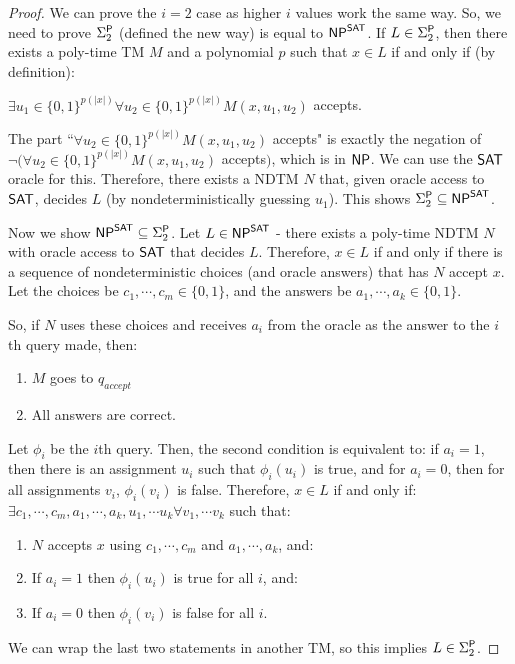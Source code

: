 \begin{proof}
We can prove the $i=2$ case as higher $i$ values work the same way. So, we need to prove $\Sigma_2^\P$ (defined the new way) is equal to $\NP^{\SAT}$. If $L \in \Sigma_2^\P$, then there exists a poly-time TM $M$ and a polynomial $p$ such that $x \in L$ if and only if (by definition):
\begin{center}
$\exists u_1 \in \{0, 1\}^{p(|x|)} \forall u_2 \in \{0, 1\}^{p(|x|)} M(x, u_1, u_2)$ accepts.
\end{center}
The part ``$\forall u_2 \in \{0, 1\}^{p(|x|)} M(x, u_1, u_2)$ accepts" is exactly the negation of $\neg (\forall u_2 \in \{0, 1\}^{p(|x|)} M(x, u_1, u_2)$ accepts$)$, which is in $\NP$. We can use the $\SAT$ oracle for this. Therefore, there exists a NDTM $N$ that, given oracle access to $\SAT$, decides $L$ (by nondeterministically guessing $u_1$). This shows $\Sigma_2^\P \subseteq \NP^{\SAT}$.

\par Now we show $\NP^{\SAT} \subseteq \Sigma_2^\P$. Let $L \in \NP^{\SAT}$ - there exists a poly-time NDTM $N$ with oracle access to $\SAT$ that decides $L$. Therefore, $x \in L$ if and only if there is a sequence of nondeterministic choices (and oracle answers) that has $N$ accept $x$. Let the choices be $c_1, \cdots, c_m \in \{0, 1\}$, and the answers be $a_1, \cdots, a_k \in \{0, 1\}$.

\par So, if $N$ uses these choices and receives $a_i$ from the oracle as the answer to the $i$th query made, then:
\begin{enumerate}
\item $M$ goes to $q_{accept}$
\item All answers are correct.
\end{enumerate}
Let $\phi_i$ be the $i$th query. Then, the second condition is equivalent to: if $a_i = 1$, then there is an assignment $u_i$ such that $\phi_i(u_i)$ is true, and for $a_i = 0$, then for all assignments $v_i$, $\phi_i(v_i)$ is false. Therefore, $x \in L$ if and only if: $\exists c_1, \cdots, c_m, a_1, \cdots, a_k, u_1, \cdots u_k \forall v_1, \cdots v_k$ such that:
\begin{enumerate}
\item $N$ accepts $x$ using $c_1, \cdots, c_m$ and $a_1, \cdots, a_k$, and:
\item If $a_i = 1$ then $\phi_i(u_i)$ is true for all $i$, and:
\item If $a_i = 0$ then $\phi_i(v_i)$ is false for all $i$.
\end{enumerate}
We can wrap the last two statements in another TM, so this implies $L \in \Sigma_2^\P$.
\end{proof}


